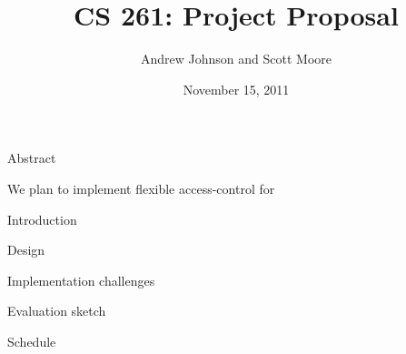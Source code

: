 \documentclass[10pt]{article}
\begin{document}
\title{CS 261: Project Proposal}
\author{Andrew Johnson and Scott Moore}
\date{November 15, 2011}

\maketitle

\thispagestyle{empty}

\begin{comment}

\begin{problem}{Problem Title}
Problem Statement
\newline\newline
\textbf{\emph{Solution}}:
\newline\newline
Solution goes here
\end{problem}

\end{comment}

\begin{section}{Abstract}

We plan to implement flexible access-control for 

\end{section}

\begin{section}{Introduction}
\end{section}

\begin{section}{Design}
\end{section}

\begin{section}{Implementation challenges}
\end{section}

\begin{section}{Evaluation sketch}
\end{section}

\begin{section}{Schedule}
\end{section}
\end{document}
